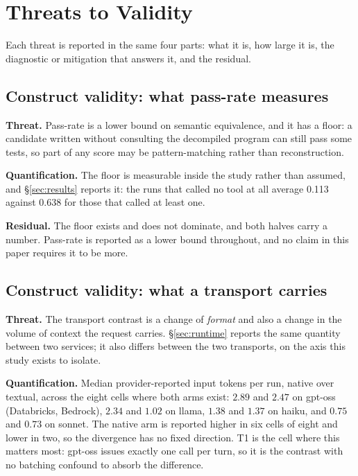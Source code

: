 \section{Threats to Validity}
\label{sec:threats}

Each threat is reported in the same four parts: what it is, how large it is, the diagnostic or
mitigation that answers it, and the residual.

\subsection{Construct validity: what pass-rate measures}

\textbf{Threat.} Pass-rate is a lower bound on semantic equivalence, and it has a floor: a
candidate written without consulting the decompiled program can still pass some tests, so part
of any score may be pattern-matching rather than reconstruction.

\textbf{Quantification.} The floor is measurable inside the study rather than assumed, and
\S\ref{sec:results} reports it: the runs that called no tool at all average 0.113 against 0.638 for those
that called at least one.

\textbf{Residual.} The floor exists and does not dominate, and both halves carry a number. Pass-rate is
reported as a lower bound throughout, and no claim in this paper requires it to be more.

\subsection{Construct validity: what a transport carries}

\textbf{Threat.} The transport contrast is a change of \emph{format} and also a change in the volume of
context the request carries. \S\ref{sec:runtime} reports the same quantity between two services; it also
differs between the two transports, on the axis this study exists to isolate.

\textbf{Quantification.} Median provider-reported input tokens per run, native over textual, across the
eight cells where both arms exist: $2.89$ and $2.47$ on gpt-oss (Databricks, Bedrock), $2.34$ and $1.02$ on
llama, $1.38$ and $1.37$ on haiku, and $0.75$ and $0.73$ on sonnet. The native arm is reported higher in six
cells of eight and lower in two, so the divergence has no fixed direction. T1 is the cell where this matters
most: gpt-oss issues exactly one call per turn, so it is the contrast with no batching confound to absorb
the difference.

